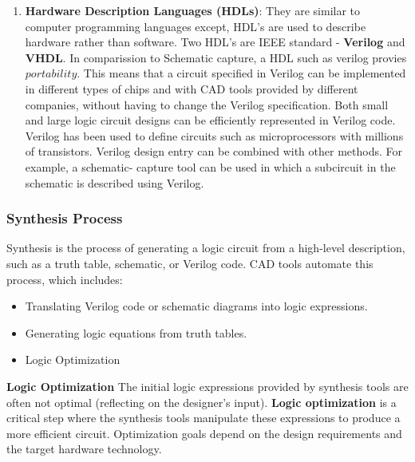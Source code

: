\documentclass[a4paper,12pt]{article}
\begin{document}
\begin{enumerate}
        \item \textbf{Hardware Description Languages (HDLs)}: They are similar to computer programming languages except, HDL's are used to describe hardware rather than software. Two HDL's are IEEE standard - \textbf{Verilog} and \textbf{VHDL}. In comparission to Schematic capture, a HDL such as verilog provies $portability$. This means that a circuit specified in Verilog can be implemented in different types of chips and with CAD tools provided by different companies, without having to change the Verilog specification. Both small and large logic circuit designs can be efficiently represented in Verilog code. Verilog has been used to define circuits such as microprocessors with millions of transistors. Verilog design entry can be combined with other methods. For example, a schematic-
          capture tool can be used in which a subcircuit in the schematic is described using Verilog.
      \end{enumerate}


      \subsubsection{Synthesis Process}
      Synthesis is the process of generating a logic circuit from a high-level description, such as a truth table, schematic, or Verilog code. CAD tools automate this process, which includes:
      \begin{itemize}
        \item Translating Verilog code or schematic diagrams into logic expressions.
        \item Generating logic equations from truth tables.
        \item Logic Optimization
      \end{itemize}

      \textbf{Logic Optimization}\newline
      The initial logic expressions provided by synthesis tools are often not optimal (reflecting on the designer's input). \textbf{Logic optimization} is a critical step where the synthesis tools manipulate these expressions to produce a more efficient circuit. Optimization goals depend on the design requirements and the target hardware technology. 
\end{document}
